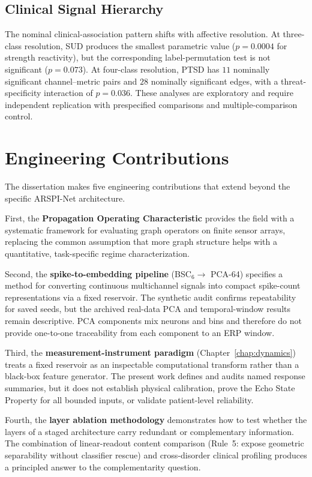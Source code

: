 \subsection{Clinical Signal Hierarchy}

The nominal clinical-association pattern shifts with affective resolution. At three-class resolution, SUD produces the smallest parametric value ($p = 0.0004$ for strength reactivity), but the corresponding label-permutation test is not significant ($p = 0.073$). At four-class resolution, PTSD has $11$ nominally significant channel--metric pairs and $28$ nominally significant edges, with a threat-specificity interaction of $p = 0.036$. These analyses are exploratory and require independent replication with prespecified comparisons and multiple-comparison control.


\section{Engineering Contributions}

The dissertation makes five engineering contributions that extend beyond the specific ARSPI-Net architecture.

First, the \textbf{Propagation Operating Characteristic} provides the field with a systematic framework for evaluating graph operators on finite sensor arrays, replacing the common assumption that more graph structure helps with a quantitative, task-specific regime characterization.

Second, the \textbf{spike-to-embedding pipeline} (BSC$_6 \to$ PCA-64) specifies a method for converting continuous multichannel signals into compact spike-count representations via a fixed reservoir. The synthetic audit confirms repeatability for saved seeds, but the archived real-data PCA and temporal-window results remain descriptive. PCA components mix neurons and bins and therefore do not provide one-to-one traceability from each component to an ERP window.

Third, the \textbf{measurement-instrument paradigm} (Chapter~\ref{chap:dynamics}) treats a fixed reservoir as an inspectable computational transform rather than a black-box feature generator. The present work defines and audits named response summaries, but it does not establish physical calibration, prove the Echo State Property for all bounded inputs, or validate patient-level reliability.

Fourth, the \textbf{layer ablation methodology} demonstrates how to test whether the layers of a staged architecture carry redundant or complementary information. The combination of linear-readout content comparison (Rule~5: expose geometric separability without classifier rescue) and cross-disorder clinical profiling produces a principled answer to the complementarity question.

